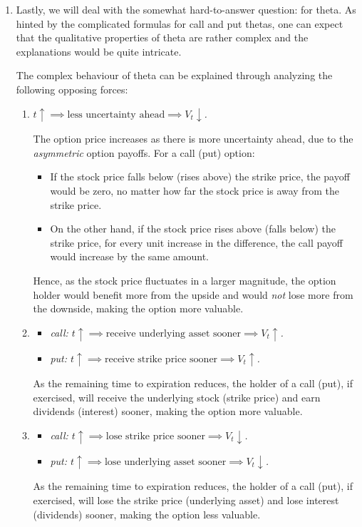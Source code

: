 \begin{enumerate}
\item Lastly, we will deal with the somewhat hard-to-answer question:
 for theta. As hinted by the complicated formulas for
call and put thetas, one can expect that the qualitative properties of theta
are rather complex and the explanations would be quite intricate.

The complex behaviour of theta can be explained through analyzing the following
opposing forces:
\begin{enumerate}[label={F\arabic*}]
\item \label{it:less-uncertainty} \emph{\(t\uparrow\implies \text{less
uncertainty ahead}\implies V_t\downarrow\).}

The option price increases as there is more
uncertainty ahead, due to the \emph{asymmetric} option payoffs. For a call
(put) option:
\begin{itemize}
\item If the stock price falls below (rises above) the strike price, the payoff
would be zero, no matter how far the stock price is away from the strike price.
\item On the other hand, if the stock price rises above (falls below) the
strike price, for every unit increase in the difference, the call payoff would
increase by the same amount.
\end{itemize}
Hence, as the stock price fluctuates in a larger magnitude, the option holder
would benefit more from the upside and would \emph{not} lose more from the
downside, making the option more valuable.

\item\label{it:receive-sooner} \begin{itemize}
\item \emph{call: \(t\uparrow \implies \text{receive underlying asset sooner}
\implies V_t\uparrow\).}
\item \emph{put: \(t\uparrow \implies \text{receive strike price sooner}
\implies V_t\uparrow\).}
\end{itemize}
As the remaining time to expiration reduces, the holder of a call (put), if
exercised, will receive the underlying stock (strike price) and
earn dividends (interest) sooner, making the option more valuable.

\item\label{it:lose-sooner} \begin{itemize}
\item \emph{call: \(t\uparrow \implies \text{lose strike price sooner}
\implies V_t\downarrow\).}
\item \emph{put: \(t\uparrow \implies \text{lose underlying asset sooner}
\implies V_t\downarrow\).}
\end{itemize}
As the remaining time to expiration reduces, the holder of a call (put), if
exercised, will lose the strike price (underlying asset) and lose interest
(dividends) sooner, making the option less valuable.
\end{enumerate}


\end{enumerate}
